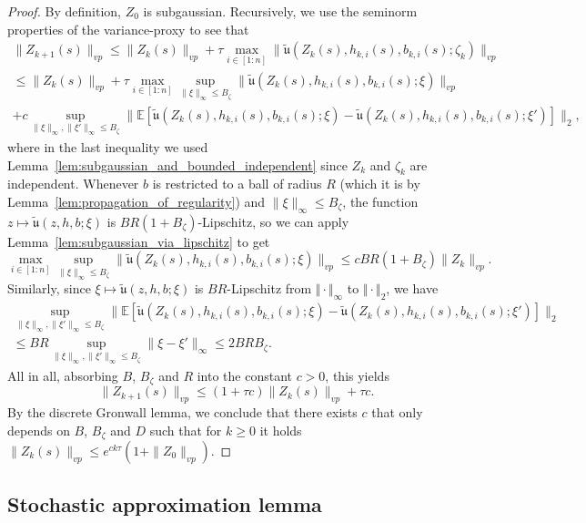 \documentclass[a4paper,11pt]{article}
\newcommand{\1}{\mathbbm{1}}
\newcommand{\E}{\mathbb{E}}
\theoremstyle{definition}
\theoremstyle{remark}
\begin{document}
\begin{proof}
By definition, $Z_0$ is subgaussian. Recursively, we use the seminorm properties of the variance-proxy to see that
\begin{multline*}
    \|Z_{k+1}(s)\|_{vp} \le \|Z_k(s)\|_{vp} + \tau \max_{i \in [1:n]} \|\tilde{\mathfrak{u}}(Z_k(s), h_{k,i}(s), b_{k,i}(s){;\zeta_k})\|_{vp}\\
    \le \|Z_k(s)\|_{vp} + \tau \max_{i \in [1:n]}\sup_{\|\xi\|_{\infty}\leq B_\zeta} \|\tilde{\mathfrak{u}}(Z_k(s), h_{k,i}(s), b_{k,i}(s){;\xi})\|_{vp} \\{+ c\sup_{\|\xi\|_{\infty}, \|\xi'\|_{\infty}\leq B_\zeta} \|\E[\tilde{\mathfrak{u}}(Z_k(s), h_{k,i}(s), b_{k,i}(s){;\xi}) - \tilde{\mathfrak{u}}(Z_k(s), h_{k,i}(s), b_{k,i}(s){;\xi'})]\|_{2},}
\end{multline*}
where in the last inequality we used Lemma~\ref{lem:subgaussian_and_bounded_independent} since $Z_k$ and $\zeta_k$ are independent.
{Whenever $b$ is restricted to a ball of radius $R$ (which it is by Lemma~\ref{lem:propagation_of_regularity}) and $\|\xi\|_\infty \leq B_\zeta$, the function $z \mapsto \tilde{\mathfrak{u}}(z,h,b;\xi)$ is $BR(1+B_\zeta)$-Lipschitz, so we can apply Lemma~\ref{lem:subgaussian_via_lipschitz}} to get
\[{\max_{i \in [1:n]}\sup_{\|\xi\|_{\infty}\leq B_\zeta} \|\tilde{\mathfrak{u}}(Z_k(s), h_{k,i}(s), b_{k,i}(s){;\xi})\|_{vp} \leq cBR(1+B_\zeta)\|Z_k\|_{vp}}.\]
Similarly, since $\xi \mapsto \tilde{\mathfrak{u}}(z,h,b;\xi)$ is $BR$-Lipschitz from $\Vert\cdot\Vert_\infty$ to $\Vert\cdot\Vert_2$, we have
\begin{multline*}
    \sup_{\|\xi\|_{\infty}, \|\xi'\|_{\infty}\leq B_\zeta} \|\E[\tilde{\mathfrak{u}}(Z_k(s), h_{k,i}(s), b_{k,i}(s){;\xi}) - \tilde{\mathfrak{u}}(Z_k(s), h_{k,i}(s), b_{k,i}(s){;\xi'})]\|_{2} \\\leq BR\sup_{\|\xi\|_{\infty}, \|\xi'\|_{\infty}\leq B_\zeta}\|\xi - \xi'\|_\infty \leq 2BRB_\zeta.
\end{multline*}
All in all, absorbing $B$, $B_\zeta$ and $R$ into the constant $c >0$, this yields
\[{\|Z_{k+1}(s)\|_{vp} \le (1+\tau c)\|Z_k(s)\|_{vp} + \tau c.}\]
{By the discrete Gronwall lemma, we conclude that there exists $c$ that only depends on $B$, $B_\zeta$ and $D$ such that for $k \ge 0$ it holds $\|Z_k(s)\|_{vp} \leq e^{c k \tau} (1+\|Z_0\|_{vp})$}.
\end{proof}

\subsection{Stochastic approximation lemma}\label{app:stochastic_approximation}
\end{document}
